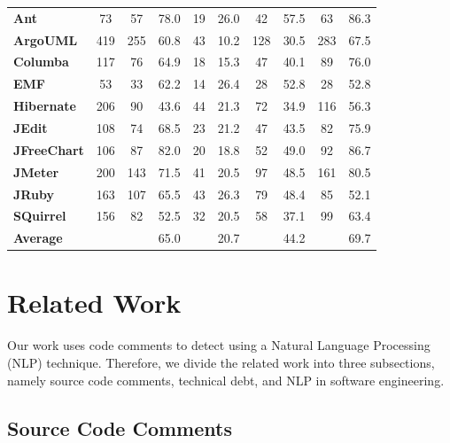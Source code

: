 \begin{landscape}
\begin{table}[!thb]
{\begin{tabular}{l| c c c c c c c c c}
        \textbf{Ant}            & 73  & 57   & 78.0  & 19 & 26.0  & 42  & 57.5 & 63  & 86.3   \\
        \textbf{ArgoUML}        & 419 & 255  & 60.8  & 43 & 10.2  & 128 & 30.5 & 283 & 67.5   \\
        \textbf{Columba}        & 117 & 76   & 64.9  & 18 & 15.3  & 47  & 40.1 & 89  & 76.0   \\
        \textbf{EMF}            & 53  & 33   & 62.2  & 14 & 26.4  & 28  & 52.8 & 28  & 52.8   \\
        \textbf{Hibernate}      & 206 & 90   & 43.6  & 44 & 21.3  & 72  & 34.9 & 116 & 56.3   \\
        \textbf{JEdit}          & 108 & 74   & 68.5  & 23 & 21.2  & 47  & 43.5 & 82  & 75.9   \\
        \textbf{JFreeChart}     & 106 & 87   & 82.0  & 20 & 18.8  & 52  & 49.0 & 92  & 86.7   \\
        \textbf{JMeter}         & 200 & 143  & 71.5  & 41 & 20.5  & 97  & 48.5 & 161 & 80.5   \\
        \textbf{JRuby}          & 163 & 107  & 65.5  & 43 & 26.3  & 79  & 48.4 & 85  & 52.1   \\
        \textbf{SQuirrel}       & 156 & 82   & 52.5  & 32 & 20.5  & 58  & 37.1 & 99  & 63.4   \\
        \midrule
        \textbf{Average}        &     &      & 65.0  &    & 20.7  &     & 44.2 &     & 69.7  \\

        \bottomrule
        \end{tabular}}
\end{table} 
\end{landscape}

\section{Related Work}
\label{chap4:sec:related_work}

Our work uses code comments to detect \SATD using a Natural Language Processing (NLP) technique. Therefore, we divide the related work into three subsections, namely source code comments, technical debt, and NLP in software engineering.

\subsection{Source Code Comments}

